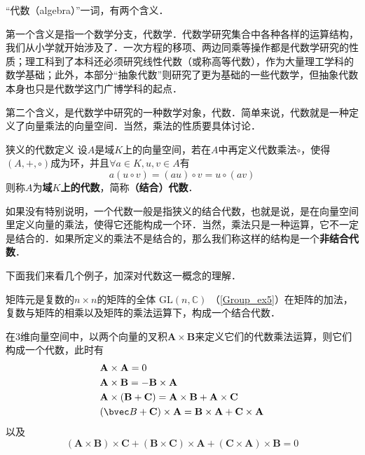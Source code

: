 

“代数（algebra）”一词，有两个含义．

第一个含义是指一个数学分支，代数学．代数学研究集合中各种各样的运算结构，我们从小学就开始涉及了．一次方程的移项、两边同乘等操作都是代数学研究的性质；理工科到了本科还必须研究线性代数（或称高等代数），作为大量理工学科的数学基础；此外，本部分“抽象代数”则研究了更为基础的一些代数学，但抽象代数本身也只是代数学这门广博学科的起点．

第二个含义，是代数学中研究的一种数学对象，代数．简单来说，代数就是一种定义了向量乘法的向量空间．当然，乘法的性质要具体讨论．



\begin{definition}{狭义的代数定义}
设$A$是域$K$上的向量空间，若在$A$中再定义代数乘法$\circ$，使得$(A,+,\circ)$成为环，并且$\forall a\in K, u, v\in A$有
\begin{equation}
a(u \circ v)=(a u) \circ v=u{\circ}(a v)
\end{equation}
则称$A$为\textbf{域$K$上的代数}，简称\textbf{（结合）代数}．

\end{definition}

如果没有特别说明，一个代数一般是指狭义的结合代数，也就是说，是在向量空间里定义向量的乘法，使得它还能构成一个环．当然，乘法只是一种运算，它不一定是结合的．如果所定义的乘法不是结合的，那么我们称这样的结构是一个\textbf{非结合代数}．

下面我们来看几个例子，加深对代数这一概念的理解．

\begin{example}{}
矩阵元是复数的$n\times n$的矩阵的全体 $\mathrm{GL}(n, \mathbb C)$ （\autoref{Group_ex5}）在矩阵的加法，复数与矩阵的相乘以及矩阵的乘法运算下，构成一个结合代数．
\end{example}

\begin{example}{}
在$3$维向量空间中，以两个向量的叉积$\mathbf A\times \mathbf B$来定义它们的代数乘法运算，则它们构成一个代数，此时有
\begin{equation}
\begin{aligned}
&\mathbf{A} \times \mathbf{A}=0\\
&\mathbf{A} \times \mathbf{B}=-\mathbf{B} \times \mathbf{A}\\
&\mathbf{A} \times(\mathbf{B}+\mathbf{C})=\mathbf{A} \times \mathbf{B}+\mathbf{A} \times \mathbf{C}\\
&(\bvec B+\mathbf{C}) \times \mathbf{A}=\mathbf{B} \times \mathbf{A}+\mathbf{C} \times \mathbf{A}
\end{aligned}
\end{equation}
以及
\begin{equation} \label{AlgFie_eq1}
(\mathbf{A} \times \mathbf{B}) \times \mathbf{C}+(\mathbf{B} \times \mathbf{C}) \times \mathbf{A}+(\mathbf{C} \times \mathbf{A}) \times \mathbf{B}=0
\end{equation}
\end{example}

